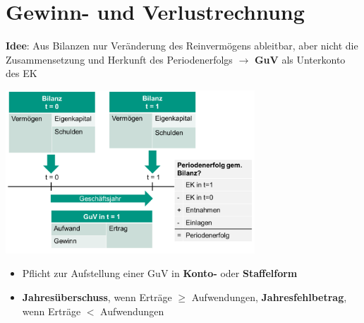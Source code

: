 \section{Gewinn- und Verlustrechnung}

\textbf{Idee}: Aus Bilanzen nur Veränderung des Reinvermögens ableitbar, aber nicht die Zusammensetzung und Herkunft des Periodenerfolgs $\rightarrow$ \textbf{GuV} als Unterkonto des EK
\begin{center}
	\includegraphics[width=0.7\textwidth]{images/guv.png}
\end{center}
\begin{itemize}
	\item Pflicht zur Aufstellung einer GuV in \textbf{Konto-} oder \textbf{Staffelform}
	\item \textbf{Jahresüberschuss}, wenn Erträge $\geq$ Aufwendungen, \textbf{Jahresfehlbetrag}, wenn Erträge $<$ Aufwendungen
\end{itemize}

